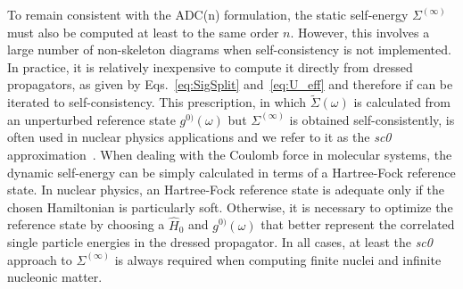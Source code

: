 To remain consistent with the ADC(n) formulation,  the static self-energy $\Sigma^{(\infty)}$ must also be computed at least to the same order $n$. However, this involves a large number of non-skeleton diagrams when self-consistency is not implemented. In practice, it is relatively inexpensive to compute it directly from dressed propagators, as given by Eqs.~\eqref{eq:SigSplit} and~\eqref{eq:U_eff} and therefore if can be iterated to self-consistency.
This prescription, in which $\widetilde\Sigma(\omega)$ is calculated from an unperturbed reference state $g^{0)}(\omega)$ but $\Sigma^{(\infty)}$
is obtained self-consistently, is often used in nuclear physics applications and we refer to it as the {\em sc0} approximation~\cite{ch11_Soma2014Lanc}.
When dealing with the Coulomb force in molecular systems, the dynamic self-energy can be simply calculated in terms of a Hartree-Fock reference state.  In nuclear physics, an Hartree-Fock reference state is adequate only if the chosen Hamiltonian is particularly soft.  Otherwise, it is necessary to optimize the reference state by choosing a $\widehat{H}_0$ and $g^{0)}(\omega)$  that better represent the correlated single particle energies in the dressed propagator. In all cases, at least the {\em sc0} approach to $\Sigma^{(\infty)}$ is always required when computing finite nuclei and infinite nucleonic matter.

